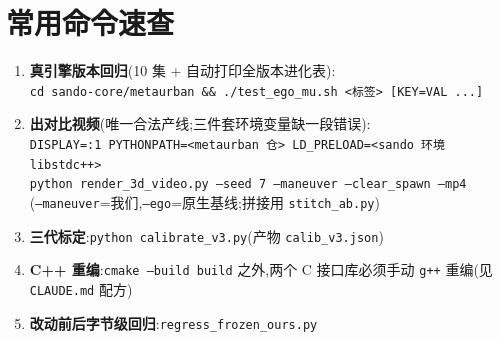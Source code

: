 \documentclass[11pt]{ctexart}
\newcommand{\code}[1]{\texttt{#1}}
\begin{document}
\section{常用命令速查}

\begin{enumerate}
  \item \textbf{真引擎版本回归}(10 集 + 自动打印全版本进化表):\\
        \code{cd sando-core/metaurban \&\& ./test\_ego\_mu.sh <标签> [KEY=VAL ...]}
  \item \textbf{出对比视频}(唯一合法产线;三件套环境变量缺一段错误):\\
        \code{DISPLAY=:1 PYTHONPATH=<metaurban 仓> LD\_PRELOAD=<sando 环境 libstdc++>}\\
        \code{python render\_3d\_video.py --seed 7 --maneuver --clear\_spawn --mp4}\\
        (\code{--maneuver}=我们,\code{--ego}=原生基线;拼接用 \code{stitch\_ab.py})
  \item \textbf{三代标定}:\code{python calibrate\_v3.py}(产物 \code{calib\_v3.json})
  \item \textbf{C++ 重编}:\code{cmake --build build} 之外,两个 C 接口库必须手动
        \code{g++} 重编(见 \code{CLAUDE.md} 配方)
  \item \textbf{改动前后字节级回归}:\code{regress\_frozen\_ours.py}
\end{enumerate}
\end{document}
